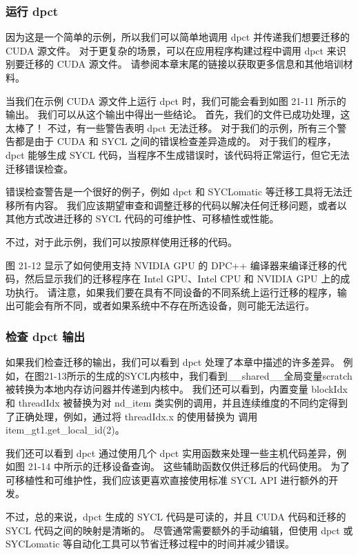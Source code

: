 \subsubsection{运行 dpct}

因为这是一个简单的示例，所以我们可以简单地调用 dpct 并传递我们想要迁移的 CUDA 源文件。 对于更复杂的场景，可以在应用程序构建过程中调用 dpct 来识别要迁移的 CUDA 源文件。 请参阅本章末尾的链接以获取更多信息和其他培训材料。

当我们在示例 CUDA 源文件上运行 dpct 时，我们可能会看到如图 21-11 所示的输出。 我们可以从这个输出中得出一些结论。 首先，我们的文件已成功处理，这太棒了！ 不过，有一些警告表明 dpct 无法迁移。 对于我们的示例，所有三个警告都是由于 CUDA 和 SYCL 之间的错误检查差异造成的。 对于我们的程序，dpct 能够生成 SYCL 代码，当程序不生成错误时，该代码将正常运行，但它无法迁移错误检查。

错误检查警告是一个很好的例子，例如 dpct 和 SYCLomatic 等迁移工具将无法迁移所有内容。 我们应该期望审查和调整迁移的代码以解决任何迁移问题，或者以其他方式改进迁移的 SYCL 代码的可维护性、可移植性或性能。

不过，对于此示例，我们可以按原样使用迁移的代码。

图 21-12 显示了如何使用支持 NVIDIA GPU 的 DPC++ 编译器来编译迁移的代码，然后显示我们的迁移程序在 Intel GPU、Intel CPU 和 NVIDIA GPU 上的成功执行。 请注意，如果我们要在具有不同设备的不同系统上运行迁移的程序，输出可能会有所不同，或者如果系统中不存在所选设备，则可能无法运行。

\subsubsection{检查 dpct 输出}

如果我们检查迁移的输出，我们可以看到 dpct 处理了本章中描述的许多差异。 例如，在图21-13所示的生成的SYCL内核中，我们看到\_\_shared\_\_全局变量scratch被转换为本地内存访问器并传递到内核中。 我们还可以看到，内置变量 blockIdx 和 threadIdx 被替换为对 nd\_item 类实例的调用，并且连续维度的不同约定得到了正确处理，例如，通过将 threadIdx.x 的使用替换为 调用 item\_gt1.get\_local\_id(2)。

我们还可以看到 dpct 通过使用几个 dpct 实用函数来处理一些主机代码差异，例如图 21-14 中所示的迁移设备查询。 这些辅助函数仅供迁移后的代码使用。 为了可移植性和可维护性，我们应该更喜欢直接使用标准 SYCL API 进行额外的开发。

不过，总的来说，dpct 生成的 SYCL 代码是可读的，并且 CUDA 代码和迁移的 SYCL 代码之间的映射是清晰的。 尽管通常需要额外的手动编辑，但使用 dpct 或 SYCLomatic 等自动化工具可以节省迁移过程中的时间并减少错误。

